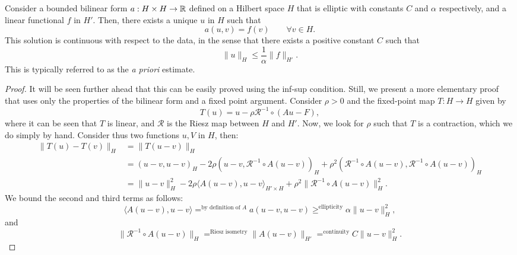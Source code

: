 \begin{lemma} Consider a bounded bilinear form $a: H\times H\to \mathbb{R}$ defined on a Hilbert space $H$ that is elliptic with constants $C$ and $\alpha$ respectively, and a linear functional $f$ in $H'$. Then, there exists a unique $u$ in $H$ such that 
    \begin{equation*}
a(u, v) = f(v) \qquad \forall v \in H.
\end{equation*}
This solution is continuous with respect to the data, in the sense that there exists a positive constant $C$ such that 
    \begin{equation*}
\| u\|_H \leq \frac 1 \alpha \| f \|_{H'} .
\end{equation*}
This is typically referred to as the \emph{a priori} estimate. 
\end{lemma}
\begin{proof}
    It will be seen further ahead that this can be easily proved using the inf-sup condition. Still, we present a more elementary proof that uses only the properties of the bilinear form and a fixed point argument. Consider $\rho>0$ and the fixed-point map $T:H\to H$ given by 
    \begin{equation*}
T(u) = u - \rho \mathcal R^{-1}\circ (Au - F),
\end{equation*}
    where it can be seen that $T$ is linear, and $\mathcal R$ is the Riesz map between $H$ and $H'$. Now, we look for $\rho$ such that $T$ is a contraction, which we do simply by hand. Consider thus two functions $u,V$ in $H$, then: 
    \begin{align*}
        \| T(u) - T(v)\|_H &= \|T(u - v) \|_H \\
                           &= (u-v, u-v)_H - 2\rho(u-v, \mathcal R^{-1}\circ A(u-v))_H + \rho^2(\mathcal R^{-1}\circ A(u-v), \mathcal R^{-1}\circ A(u-v))_H \\
                           &= \|u-v\|_H^2 - 2\rho\langle A(u-v), u-v\rangle_{H'\times H} + \rho^2 \| \mathcal R^{-1} \circ A(u-v)\|_H^2.
    \end{align*}
    We bound the second and third terms as follows: 
    \begin{equation*}
\langle A(u-v), u-v\rangle =^\text{by definition of $A$} a(u-v, u-v) \geq^\text{ellipticity} \alpha \| u-v\|_H^2,
\end{equation*} 
        and 
        \begin{equation*}
\| \mathcal R^{-1} \circ A(u-v) \|_H =^\text{Riesz isometry} \| A(u-v) \|_{H'} =^\text{continuity} C \| u-v \|_H^2.

\end{equation*}
\end{proof}

